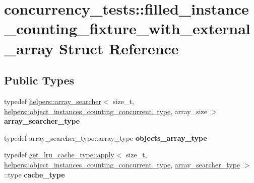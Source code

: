 \hypertarget{structconcurrency__tests_1_1filled__instance__counting__fixture__with__external__array}{}\section{concurrency\+\_\+tests\+:\+:filled\+\_\+instance\+\_\+counting\+\_\+fixture\+\_\+with\+\_\+external\+\_\+array Struct Reference}
\label{structconcurrency__tests_1_1filled__instance__counting__fixture__with__external__array}
\subsection*{Public Types}
\begin{DoxyCompactItemize}
\item 
\hypertarget{structconcurrency__tests_1_1filled__instance__counting__fixture__with__external__array_a8a7e8dd4e6325517dca90cf001c767fb}{}typedef \hyperlink{structconcurrency__tests_1_1helpers_1_1array__searcher}{helpers\+::array\+\_\+searcher}$<$ size\+\_\+t, \hyperlink{structhelpers_1_1object__instances__counting__type}{helpers\+::object\+\_\+instances\+\_\+counting\+\_\+concurrent\+\_\+type}, array\+\_\+size $>$ {\bfseries array\+\_\+searcher\+\_\+type}\label{structconcurrency__tests_1_1filled__instance__counting__fixture__with__external__array_a8a7e8dd4e6325517dca90cf001c767fb}

\item 
\hypertarget{structconcurrency__tests_1_1filled__instance__counting__fixture__with__external__array_a5cb22b94b3f7483e38a30d7457c089bc}{}typedef array\+\_\+searcher\+\_\+type\+::array\+\_\+type {\bfseries objects\+\_\+array\+\_\+type}\label{structconcurrency__tests_1_1filled__instance__counting__fixture__with__external__array_a5cb22b94b3f7483e38a30d7457c089bc}

\item 
\hypertarget{structconcurrency__tests_1_1filled__instance__counting__fixture__with__external__array_a9aff4f3aa15619f958d9db5d6d6c2896}{}typedef \hyperlink{structget__lru__cache__type_1_1apply}{get\+\_\+lru\+\_\+cache\+\_\+type\+::apply}$<$ size\+\_\+t, \hyperlink{structhelpers_1_1object__instances__counting__type}{helpers\+::object\+\_\+instances\+\_\+counting\+\_\+concurrent\+\_\+type}, \hyperlink{structconcurrency__tests_1_1helpers_1_1array__searcher}{array\+\_\+searcher\+\_\+type} $>$\+::type {\bfseries cache\+\_\+type}\label{structconcurrency__tests_1_1filled__instance__counting__fixture__with__external__array_a9aff4f3aa15619f958d9db5d6d6c2896}

\end{DoxyCompactItemize}

